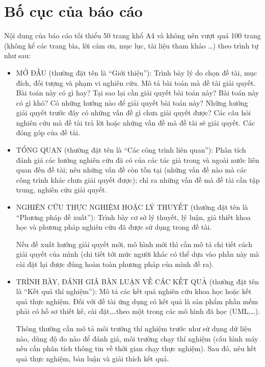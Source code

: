 \section{Bố cục của báo cáo}

Nội dung của báo cáo tối thiểu 50 trang khổ A4 và không nên vượt quá 100 trang (không kể các trang bìa, lời cám ơn, mục lục, tài liệu tham khảo \ldots) theo trình tự như sau:

\begin{itemize}
\item MỞ ĐẦU (thường đặt tên là ``Giới thiệu''): Trình bày lý do chọn đề tài, mục đích, đối tượng và phạm vi nghiên cứu.
Mô tả bài toán mà đề tài giải quyết.
Bài toán này có gì hay?
Tại sao lại cần giải quyết bài toán này?
Bài toán này có gì khó?
Có những hướng nào để giải quyết bài toán này?
Những hướng giải quyết trước đây có những vấn đề gì chưa giải quyết được?
Các câu hỏi nghiên cứu mà đề tài trả lời hoặc những vấn đề mà đề tài sẽ giải quyết.
Các đóng góp của đề tài.

\item TỔNG QUAN (thường đặt tên là ``Các công trình liên quan''): Phân tích đánh giá các hướng nghiên cứu đã có của các tác giả trong và ngoài nước liên quan đến đề tài; nêu những vấn đề còn tồn tại (những vấn đề nào mà các công trình khác chưa giải quyết được); chỉ ra những vấn đề mà đề tài cần tập trung, nghiên cứu giải quyết.

\item NGHIÊN CỨU THỰC NGHIỆM HOẶC LÝ THUYẾT (thường đặt tên là ``Phương pháp đề xuất''): Trình bày cơ sở lý thuyết, lý luận, giả thiết khoa học và phương pháp nghiên cứu đã được sử dụng trong đề tài.

Nếu đề xuất hướng giải quyết mới, mô hình mới thì cần mô tả chi tiết cách giải quyết của mình (chi tiết tới mức người khác có thể dựa vào phần này mà cài đặt lại được đúng hoàn toàn phương pháp của mình đề ra).

\item TRÌNH BÀY, ĐÁNH GIÁ BÀN LUẬN VỀ CÁC KẾT QUẢ (thường đặt tên là ``Kết quả thí nghiệm''): Mô tả các kết quả nghiên cứu khoa học hoặc kết quả thực nghiệm.
Đối với  đề tài ứng dụng có kết quả là sản phẩm phần mềm phải có hồ sơ thiết kế, cài đặt,\ldots theo một trong các mô hình đã học (UML,\ldots).

Thông thường cần mô tả môi trường thí nghiệm trước như sử dụng dữ liệu nào, dùng độ đo nào để đánh giá, môi trường chạy thí nghiệm (cấu hình máy nếu cần phân tích thông tin về thời gian chạy thực nghiệm). Sau đó, nêu kết quả thực nghiệm, bàn luận và giải thích kết quả.


\end{itemize}
